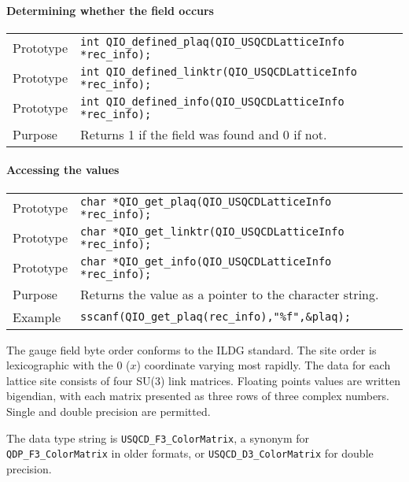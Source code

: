 \documentclass{article}
\begin{document}
\paragraph{Determining whether the field occurs}

\begin{flushleft}
  \begin{tabular}{|l|l|}
  \hline
  Prototype      & \verb|int QIO_defined_plaq(QIO_USQCDLatticeInfo *rec_info);|\\
  Prototype      & \verb|int QIO_defined_linktr(QIO_USQCDLatticeInfo *rec_info);|\\
  Prototype      & \verb|int QIO_defined_info(QIO_USQCDLatticeInfo *rec_info);|\\
    \hline
  Purpose        & Returns 1 if the field was found and 0 if not. \\
   \hline
 \end{tabular}
\end{flushleft}
%

\paragraph{Accessing the values}

\begin{flushleft}
  \begin{tabular}{|l|l|}
  \hline
  Prototype      & \verb|char *QIO_get_plaq(QIO_USQCDLatticeInfo *rec_info);|\\
  Prototype      & \verb|char *QIO_get_linktr(QIO_USQCDLatticeInfo *rec_info);|\\
  Prototype      & \verb|char *QIO_get_info(QIO_USQCDLatticeInfo *rec_info);|\\
  Purpose        & Returns the value as a pointer to the character string. \\
   \hline
  Example        & \verb|sscanf(QIO_get_plaq(rec_info),"%f",&plaq);| \\
   \hline
 \end{tabular}
\end{flushleft}
%

The gauge field byte order conforms to the ILDG standard.  The site
order is lexicographic with the 0 ($x$) coordinate varying most
rapidly.  The data for each lattice site consists of four SU(3) link
matrices.  Floating points values are written bigendian, with each
matrix presented as three rows of three complex numbers.  Single and
double precision are permitted.

The data type string is \verb|USQCD_F3_ColorMatrix|, a synonym for
\verb|QDP_F3_ColorMatrix| in older formats, or
\verb|USQCD_D3_ColorMatrix| for double precision.
\end{document}
